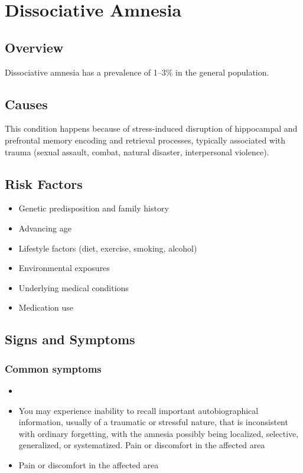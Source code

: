 \chapter{Dissociative Amnesia}
\label{sec:Dissociative Amnesia}

\section{Overview}
Dissociative amnesia has a prevalence of 1--3\% in the general population.
\section{Causes}
This condition happens because of stress-induced disruption of hippocampal and prefrontal memory encoding and retrieval processes, typically associated with trauma (sexual assault, combat, natural disaster, interpersonal violence).     
\section{Risk Factors}

\begin{itemize}[noitemsep]
  \item Genetic predisposition and family history
  \item Advancing age
  \item Lifestyle factors (diet, exercise, smoking, alcohol)
  \item Environmental exposures
  \item Underlying medical conditions
  \item Medication use
\end{itemize}
\section{Signs and Symptoms}

\subsection{Common symptoms}
\begin{itemize}[noitemsep]
  \item \item You may experience inability to recall important autobiographical information, usually of a traumatic or stressful nature, that is inconsistent with ordinary forgetting, with the amnesia possibly being localized, selective, generalized, or systematized. Pain or discomfort in the affected area    \item Pain or discomfort in the affected area
  \end{itemize}

